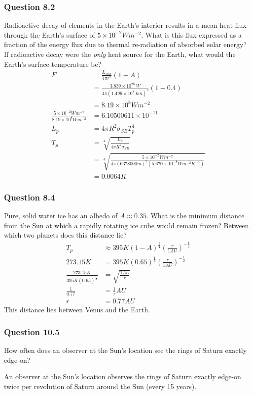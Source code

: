 \documentclass{math}
\begin{document}
\subsubsection*{Question 8.2}
Radioactive decay of elements in the Earth's interior results in a mean heat
flux through the Earth's surface of \( 5\times10^{-2}Wm^{-2} \). What is this
flux expressed as a fraction of the energy flux due to thermal re-radiation of
absorbed solar energy? If radioactive decay were the \textit{only} heat source
for the Earth, what would the Earth's surface temperature be?
\begin{align*}
  F &= \frac{L_{Sun}}{4\pi r^2}(1-A) \\
  &= \frac{3.839\times10^{26}~W}{4\pi(1.496\times10^8~km)^2}(1-0.4) \\
  &= 8.19\times10^8Wm^{-2} \\
  \frac{5\times10^{-2}Wm^{-2}}{8.19\times10^8Wm^{-2}} &=
    6.10500611\times10^{-11} \\
  L_p &= 4\pi R^2\sigma_{SB}T_p^4 \\
  T_p &= \sqrt[4]{\frac{L_p}{4\pi R^2\sigma_{SB}}} \\
  &= \sqrt[4]{\frac{5\times10^{-2}Wm^{-2}}
    {4\pi(6378000m)^2(5.670\times10^{-8}Wm^{-2}K^{-4})}} \\
  &= 0.0064K
\end{align*}

\subsubsection*{Question 8.4}
Pure, solid water ice has an albedo of \( A \approx 0.35 \). What is the
minimum distance from the Sun at which a rapidly rotating ice cube would
remain frozen? Between which two planets does this distance lie?
\begin{align*}
  T_p &\approx 395K(1-A)^{\frac{1}{4}}(\frac{r}{1AU})^{-\frac{1}{2}} \\
  273.15K &= 395K(0.65)^{\frac{1}{4}}(\frac{r}{1AU})^{-\frac{1}{2}} \\
  \frac{273.15K}{395K(0.65)^{\frac{1}{4}}} &= \sqrt{\frac{1AU}{r}} \\
  \frac{1}{0.77} &= \frac{1}{r}AU \\
  r &= 0.77AU
\end{align*}
This distance lies between Venus and the Earth.

\subsubsection*{Question 10.5}
How often does an observer at the Sun's location see the rings of Saturn exactly
edge-on? \par
An observer at the Sun's location observes the rings of Saturn exactly edge-on
twice per revolution of Saturn around the Sun (every 15 years).
\end{document}
